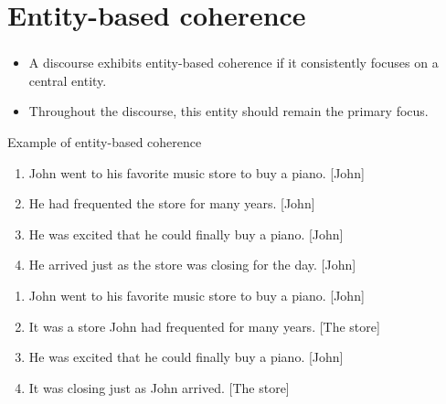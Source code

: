 \documentclass[xcolor=table]{beamer}
\begin{document}
\section{Entity-based coherence}

\begin{frame}
	\frametitle{\insertshortsubtitle}
	\framesubtitle{\insertsection}
	
	\begin{itemize}
		\item A discourse exhibits entity-based coherence if it consistently focuses on a central entity.
		\item Throughout the discourse, this entity should remain the primary focus.
	\end{itemize}
	
	\begin{exampleblock}{Example of entity-based coherence \cite{2019-jurafsky-martin}}
		\small
		\begin{minipage}{.48\textwidth}\small
			\begin{enumerate}
				\item John went to his favorite music store to buy a piano. [John]
				\item He had frequented the store for many years. [John]
				\item He was excited that he could finally buy a piano. [John]
				\item He arrived just as the store was closing for the day. [John]
			\end{enumerate}
		\end{minipage}
		\begin{minipage}{.48\textwidth}\small
			\begin{enumerate}
				\item John went to his favorite music store to buy a piano. [John]
				\item It was a store John had frequented for many years. [The store]
				\item He was excited that he could finally buy a piano. [John]
				\item It was closing just as John arrived. [The store]
			\end{enumerate}
		\end{minipage}
	\end{exampleblock}
	
\end{frame}
\end{document}
